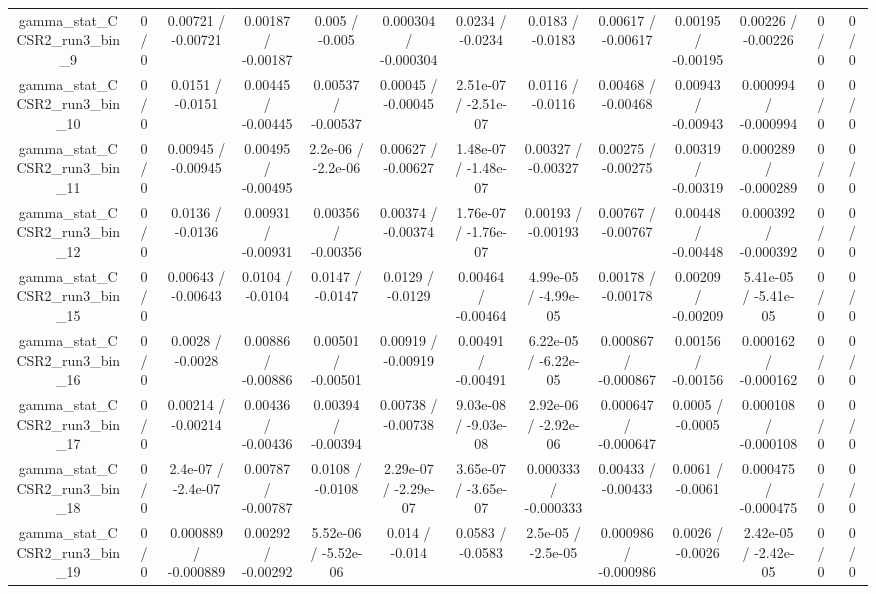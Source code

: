 \documentclass[10pt]{article}
\begin{document}
\begin{table}[htbp]
\begin{center}
\begin{tabular}{|c|c|c|c|c|c|c|c|c|c|c|c|c|}
  gamma_stat_CCSR2_run3_bin_9 & 0 / 0 & 0.00721 / -0.00721 & 0.00187 / -0.00187 & 0.005 / -0.005 & 0.000304 / -0.000304 & 0.0234 / -0.0234 & 0.0183 / -0.0183 & 0.00617 / -0.00617 & 0.00195 / -0.00195 & 0.00226 / -0.00226 & 0 / 0 & 0 / 0 \\ 
  gamma_stat_CCSR2_run3_bin_10 & 0 / 0 & 0.0151 / -0.0151 & 0.00445 / -0.00445 & 0.00537 / -0.00537 & 0.00045 / -0.00045 & 2.51e-07 / -2.51e-07 & 0.0116 / -0.0116 & 0.00468 / -0.00468 & 0.00943 / -0.00943 & 0.000994 / -0.000994 & 0 / 0 & 0 / 0 \\ 
  gamma_stat_CCSR2_run3_bin_11 & 0 / 0 & 0.00945 / -0.00945 & 0.00495 / -0.00495 & 2.2e-06 / -2.2e-06 & 0.00627 / -0.00627 & 1.48e-07 / -1.48e-07 & 0.00327 / -0.00327 & 0.00275 / -0.00275 & 0.00319 / -0.00319 & 0.000289 / -0.000289 & 0 / 0 & 0 / 0 \\ 
  gamma_stat_CCSR2_run3_bin_12 & 0 / 0 & 0.0136 / -0.0136 & 0.00931 / -0.00931 & 0.00356 / -0.00356 & 0.00374 / -0.00374 & 1.76e-07 / -1.76e-07 & 0.00193 / -0.00193 & 0.00767 / -0.00767 & 0.00448 / -0.00448 & 0.000392 / -0.000392 & 0 / 0 & 0 / 0 \\ 
  gamma_stat_CCSR2_run3_bin_15 & 0 / 0 & 0.00643 / -0.00643 & 0.0104 / -0.0104 & 0.0147 / -0.0147 & 0.0129 / -0.0129 & 0.00464 / -0.00464 & 4.99e-05 / -4.99e-05 & 0.00178 / -0.00178 & 0.00209 / -0.00209 & 5.41e-05 / -5.41e-05 & 0 / 0 & 0 / 0 \\ 
  gamma_stat_CCSR2_run3_bin_16 & 0 / 0 & 0.0028 / -0.0028 & 0.00886 / -0.00886 & 0.00501 / -0.00501 & 0.00919 / -0.00919 & 0.00491 / -0.00491 & 6.22e-05 / -6.22e-05 & 0.000867 / -0.000867 & 0.00156 / -0.00156 & 0.000162 / -0.000162 & 0 / 0 & 0 / 0 \\ 
  gamma_stat_CCSR2_run3_bin_17 & 0 / 0 & 0.00214 / -0.00214 & 0.00436 / -0.00436 & 0.00394 / -0.00394 & 0.00738 / -0.00738 & 9.03e-08 / -9.03e-08 & 2.92e-06 / -2.92e-06 & 0.000647 / -0.000647 & 0.0005 / -0.0005 & 0.000108 / -0.000108 & 0 / 0 & 0 / 0 \\ 
  gamma_stat_CCSR2_run3_bin_18 & 0 / 0 & 2.4e-07 / -2.4e-07 & 0.00787 / -0.00787 & 0.0108 / -0.0108 & 2.29e-07 / -2.29e-07 & 3.65e-07 / -3.65e-07 & 0.000333 / -0.000333 & 0.00433 / -0.00433 & 0.0061 / -0.0061 & 0.000475 / -0.000475 & 0 / 0 & 0 / 0 \\ 
  gamma_stat_CCSR2_run3_bin_19 & 0 / 0 & 0.000889 / -0.000889 & 0.00292 / -0.00292 & 5.52e-06 / -5.52e-06 & 0.014 / -0.014 & 0.0583 / -0.0583 & 2.5e-05 / -2.5e-05 & 0.000986 / -0.000986 & 0.0026 / -0.0026 & 2.42e-05 / -2.42e-05 & 0 / 0 & 0 / 0 \\ 

\end{tabular}
\end{center}
\end{table}
\end{document}
